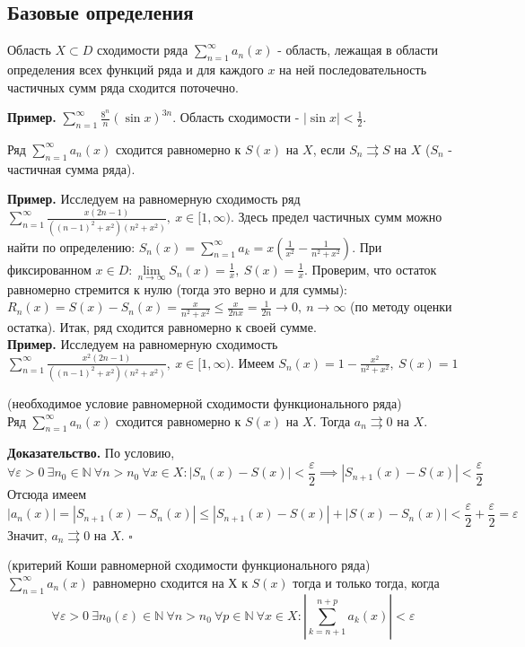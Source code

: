 \subsection{Базовые определения}
\begin{defin}
Область $X\subset D$ сходимости  ряда $\sum\limits_{n=1}^{\infty} a_n(x)$ -
область, лежащая в области определения всех функций ряда и для каждого
$x$ на ней последовательность частичных сумм ряда сходится поточечно.
\end{defin}
\textbf{Пример.} $\sum\limits_{n=1}^{\infty} \frac{8^n}{n}(\sin x)^{3n}$.
Область сходимости - $|\sin x|<\frac{1}{2}$.
\begin{defin}
Ряд $\sum\limits_{n=1}^{\infty} a_n(x)$ сходится равномерно к $S(x)$ на  $X$,
если  $S_n\rightrightarrows S$ на  $X$ ($S_n$ - частичная сумма ряда).
\end{defin}
\textbf{Пример.} Исследуем на равномерную сходимость ряд $\sum\limits_{n=1}
^{\infty} \frac{x(2n-1)}{((n-1)^2+x^2)(n^2+x^2)},~x\in[1,\infty)$. Здесь
предел частичных сумм можно найти по определению: $S_n(x)=\sum\limits_{n=1}
^{\infty} a_k=x(\frac{1}{x^2}-\frac{1}{n^2+x^2})$. При фиксированном
$x\in D: \lim\limits_{n \to \infty} S_n(x)=\frac{1}{x},~S(x)=\frac{1}{x}$.
Проверим, что остаток равномерно стремится к нулю (тогда это верно 
и для суммы): $R_n(x)=S(x)-S_n(x)=\frac{x}{n^2+x^2}\leqslant \frac{x}{2nx}=
\frac{1}{2n}\to0,~n\to\infty$ (по методу оценки остатка). Итак, ряд сходится
равномерно к своей сумме.\\
\textbf{Пример.} Исследуем на равномерную сходимость $\sum\limits_{n=1}
^{\infty} \frac{x^2(2n-1)}{((n-1)^2+x^2)(n^2+x^2)},~x\in[1,\infty)$. Имеем 
$S_n(x)=1-\frac{x^2}{n^2+x^2},~S(x)=1$ 
\begin{theor}
    (необходимое условие равномерной сходимости функционального ряда)\\
    Ряд $\sum\limits_{n=1}^{\infty} a_n(x)$ сходится равномерно к $S(x)$ на
     $X$. Тогда  $a_n\rightrightarrows0$ на $X$. 
\end{theor}
\textbf{Доказательство.}  По условию, 
$$\forall \varepsilon>0~\exists n_0\in\mathbb{N}~\forall n>n_0~\forall x\in X: |S_n(x)-S(x)|<\frac{\varepsilon}{2}\implies|S_{n+1}(x)-S(x)|<
\frac{\varepsilon}{2}$$
Отсюда имеем 
$$|a_n(x)|=|S_{n+1}(x)-S_n(x)|\leqslant |S_{n+1}(x)-S(x)|+|S(x)-S_n(x)|<
\frac{\varepsilon}{2}+\frac{\varepsilon}{2}=\varepsilon$$
Значит, $a_n\rightrightarrows0$ на $X$. $\square$ 
\begin{theor}
    (критерий Коши равномерной сходимости функционального ряда)\\
    $\sum\limits_{n=1}^{\infty} a_n(x)$ равномерно сходится на Х к $S(x)$
    тогда и только тогда, когда 
    $$\forall \varepsilon>0~\exists n_0(\varepsilon)\in\mathbb{N}
    ~\forall n>n_0~\forall p\in\mathbb{N}~\forall x\in X:|\sum\limits_{k=n+1}
    ^{n+p}a_k(x)|<\varepsilon$$
\end{theor}
